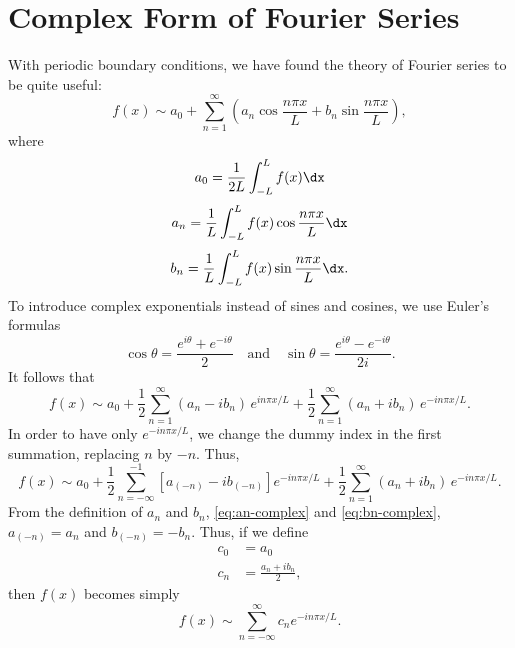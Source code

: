 \section{Complex Form of Fourier Series}
\label{sec:complex-fourier}

With periodic boundary conditions, we have found the theory of Fourier series to be quite useful:
\begin{equation}
\label{eq:fourier-real}
f(x) \sim a_0 + \sum_{n=1}^{\infty}\left(a_n \cos \frac{n\pi x}{L} + b_n \sin \frac{n\pi x}{L}\right),
\end{equation}
where
\begin{equation}
\label{eq:a0-complex}
a_0 = \frac{1}{2L}\int_{-L}^{L} f(x)\dx
\end{equation}
\begin{equation}
\label{eq:an-complex}
a_n = \frac{1}{L}\int_{-L}^{L} f(x)\cos\frac{n\pi x}{L}\dx
\end{equation}
\begin{equation}
\label{eq:bn-complex}
b_n = \frac{1}{L}\int_{-L}^{L} f(x)\sin\frac{n\pi x}{L}\dx.
\end{equation}
To introduce complex exponentials instead of sines and cosines, we use Euler's formulas
\[
\cos\theta = \frac{e^{i\theta} + e^{-i\theta}}{2} \quad \text{and} \quad \sin\theta = \frac{e^{i\theta} - e^{-i\theta}}{2i}.
\]
It follows that
\begin{equation}
\label{eq:fourier-mixed}
f(x) \sim a_0 + \frac{1}{2}\sum_{n=1}^{\infty}(a_n - ib_n)\,e^{in\pi x/L} + \frac{1}{2}\sum_{n=1}^{\infty}(a_n + ib_n)\,e^{-in\pi x/L}.
\end{equation}
In order to have only $e^{-in\pi x/L}$, we change the dummy index in the first summation, replacing $n$ by $-n$.  Thus,
\[
f(x) \sim a_0 + \frac{1}{2}\sum_{n=-\infty}^{-1}\left[a_{(-n)} - ib_{(-n)}\right]e^{-in\pi x/L} + \frac{1}{2}\sum_{n=1}^{\infty}(a_n + ib_n)\,e^{-in\pi x/L}.
\]
From the definition of $a_n$ and $b_n$, \eqref{eq:an-complex} and \eqref{eq:bn-complex}, $a_{(-n)} = a_n$ and $b_{(-n)} = -b_n$.  Thus, if we define
\begin{align*}
c_0 &= a_0 \\
c_n &= \frac{a_n + ib_n}{2},
\end{align*}
then $f(x)$ becomes simply
\begin{equation}
\label{eq:complex-fourier}
\boxed{f(x) \sim \sum_{n=-\infty}^{\infty} c_n e^{-in\pi x/L}.}
\end{equation}

